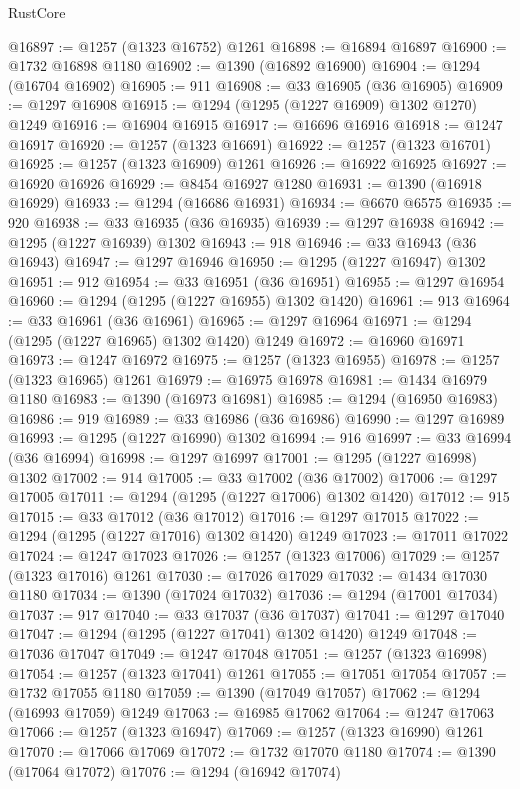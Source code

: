 \begin{lexlean}{RustCore}
\begin{coremodule}
@16897 := @1257 (@1323 @16752) @1261
@16898 := @16894 @16897
@16900 := @1732 @16898 @1180
@16902 := @1390 (@16892 @16900)
@16904 := @1294 (@16704 @16902)
@16905 := 911
@16908 := @33 @16905 (@36 @16905)
@16909 := @1297 @16908
@16915 := @1294 (@1295 (@1227 @16909) @1302 @1270) @1249
@16916 := @16904 @16915
@16917 := @16696 @16916
@16918 := @1247 @16917
@16920 := @1257 (@1323 @16691)
@16922 := @1257 (@1323 @16701)
@16925 := @1257 (@1323 @16909) @1261
@16926 := @16922 @16925
@16927 := @16920 @16926
@16929 := @8454 @16927 @1280
@16931 := @1390 (@16918 @16929)
@16933 := @1294 (@16686 @16931)
@16934 := @6670 @6575
@16935 := 920
@16938 := @33 @16935 (@36 @16935)
@16939 := @1297 @16938
@16942 := @1295 (@1227 @16939) @1302
@16943 := 918
@16946 := @33 @16943 (@36 @16943)
@16947 := @1297 @16946
@16950 := @1295 (@1227 @16947) @1302
@16951 := 912
@16954 := @33 @16951 (@36 @16951)
@16955 := @1297 @16954
@16960 := @1294 (@1295 (@1227 @16955) @1302 @1420)
@16961 := 913
@16964 := @33 @16961 (@36 @16961)
@16965 := @1297 @16964
@16971 := @1294 (@1295 (@1227 @16965) @1302 @1420) @1249
@16972 := @16960 @16971
@16973 := @1247 @16972
@16975 := @1257 (@1323 @16955)
@16978 := @1257 (@1323 @16965) @1261
@16979 := @16975 @16978
@16981 := @1434 @16979 @1180
@16983 := @1390 (@16973 @16981)
@16985 := @1294 (@16950 @16983)
@16986 := 919
@16989 := @33 @16986 (@36 @16986)
@16990 := @1297 @16989
@16993 := @1295 (@1227 @16990) @1302
@16994 := 916
@16997 := @33 @16994 (@36 @16994)
@16998 := @1297 @16997
@17001 := @1295 (@1227 @16998) @1302
@17002 := 914
@17005 := @33 @17002 (@36 @17002)
@17006 := @1297 @17005
@17011 := @1294 (@1295 (@1227 @17006) @1302 @1420)
@17012 := 915
@17015 := @33 @17012 (@36 @17012)
@17016 := @1297 @17015
@17022 := @1294 (@1295 (@1227 @17016) @1302 @1420) @1249
@17023 := @17011 @17022
@17024 := @1247 @17023
@17026 := @1257 (@1323 @17006)
@17029 := @1257 (@1323 @17016) @1261
@17030 := @17026 @17029
@17032 := @1434 @17030 @1180
@17034 := @1390 (@17024 @17032)
@17036 := @1294 (@17001 @17034)
@17037 := 917
@17040 := @33 @17037 (@36 @17037)
@17041 := @1297 @17040
@17047 := @1294 (@1295 (@1227 @17041) @1302 @1420) @1249
@17048 := @17036 @17047
@17049 := @1247 @17048
@17051 := @1257 (@1323 @16998)
@17054 := @1257 (@1323 @17041) @1261
@17055 := @17051 @17054
@17057 := @1732 @17055 @1180
@17059 := @1390 (@17049 @17057)
@17062 := @1294 (@16993 @17059) @1249
@17063 := @16985 @17062
@17064 := @1247 @17063
@17066 := @1257 (@1323 @16947)
@17069 := @1257 (@1323 @16990) @1261
@17070 := @17066 @17069
@17072 := @1732 @17070 @1180
@17074 := @1390 (@17064 @17072)
@17076 := @1294 (@16942 @17074)

\end{coremodule}
\end{lexlean}
